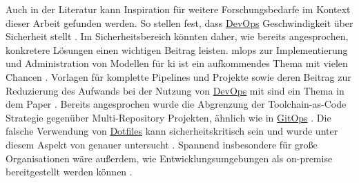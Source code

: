 Auch in der Literatur kann Inspiration für weitere Forschungsbedarfe im Kontext dieser Arbeit gefunden werden. So stellen \citeauthor{000:CI-CD-Deployment-in-DevOps-reduce-Gap-Developer-Operation} fest, dass \hyperref[sec:03-01_introduction-to-devops]{DevOps} Geschwindigkeit über Sicherheit stellt \cite{010:Efficient-Application-Deployment-GitOps-for-Faster-and-Secure-CI-CD-Cycles}. Im Sicherheitsbereich könnten daher, wie bereits angesprochen, konkretere Lösungen einen wichtigen Beitrag leisten. \Gls{mlops} zur Implementierung und Administration von Modellen für \Gls{ki} ist ein aufkommendes Thema mit vielen Chancen \cite{010:Efficient-Application-Deployment-GitOps-for-Faster-and-Secure-CI-CD-Cycles}. Vorlagen für komplette Pipelines und Projekte sowie deren Beitrag zur Reduzierung des Aufwands bei der Nutzung von \hyperref[sec:03-01_introduction-to-devops]{DevOps} mit  sind ein Thema in dem Paper  \cite{019:Advanced-DevOps-Environment-for-Microservices-based-Applications}. Bereits angesprochen wurde die Abgrenzung der Toolchain-as-Code Strategie gegenüber Multi-Repository Projekten, ähnlich wie in \hyperref[sec:03-03_gitops-as-further-evolution]{GitOps} \cite{109:GitOps}. Die falsche Verwendung von \hyperref[sec:03-04_idea-of-dotfiles]{Dotfiles} kann sicherheitskritisch sein und wurde unter diesem Aspekt von \citeauthor{029:Connecting-the-Dotfiles} genauer untersucht \cite{029:Connecting-the-Dotfiles}. Spannend insbesondere für große Organisationen wäre außerdem, wie Entwicklungsumgebungen als  on-premise bereitgestellt werden können \cite{014:Managing-Container-based-Software-Development-Environments}.
